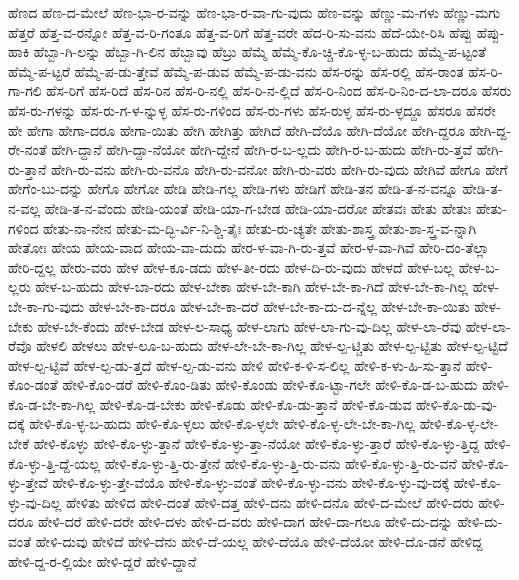 {ಹೆಣದ
ಹೆಣ-ದ-ಮೇಲೆ
ಹೆಣ-ಭಾ-ರ-ವನ್ನು
ಹೆಣ-ಭಾ-ರ-ವಾ-ಗು-ವುದು
ಹೆಣ-ವನ್ನು
ಹೆಣ್ಣು-ಮ-ಗಳು
ಹೆಣ್ಣು-ಮಗು
ಹೆತ್ತರೆ
ಹೆತ್ತ-ವ-ರನ್ನೋ
ಹೆತ್ತ-ವ-ರಿ-ಗಂತೂ
ಹೆತ್ತ-ವ-ರಿಗೆ
ಹೆತ್ತ-ವರೇ
ಹೆದ-ರಿ-ಸು-ವನು
ಹೆದೆ-ಯೇ-ರಿಸಿ
ಹೆಪ್ಪು
ಹೆಪ್ಪು-ಹಾಕಿ
ಹೆಬ್ಬಾ-ಗಿ-ಲನ್ನು
ಹೆಬ್ಬಾ-ಗಿ-ಲಿನ
ಹೆಬ್ಬಾವು
ಹೆಬ್ರು
ಹೆಮ್ಮೆ
ಹೆಮ್ಮೆ-ಕೊ-ಚ್ಚಿ-ಕೊ-ಳ್ಳ-ಬ-ಹುದು
ಹೆಮ್ಮೆ-ಪ-ಟ್ಟಂತೆ
ಹೆಮ್ಮೆ-ಪ-ಟ್ಟರೆ
ಹೆಮ್ಮೆ-ಪ-ಡು-ತ್ತೇವೆ
ಹೆಮ್ಮೆ-ಪ-ಡುವ
ಹೆಮ್ಮೆ-ಪ-ಡು-ವನು
ಹೆಸ-ರನ್ನು
ಹೆಸ-ರಲ್ಲಿ
ಹೆಸ-ರಾಂತ
ಹೆಸ-ರಿ-ಗಾ-ಗಲಿ
ಹೆಸ-ರಿಗೆ
ಹೆಸ-ರಿದೆ
ಹೆಸ-ರಿನ
ಹೆಸ-ರಿ-ನಲ್ಲಿ
ಹೆಸ-ರಿ-ನ-ಲ್ಲಿದೆ
ಹೆಸ-ರಿ-ನಿಂದ
ಹೆಸ-ರಿ-ನಿಂ-ದ-ಲಾ-ದರೂ
ಹೆಸರು
ಹೆಸ-ರು-ಗಳನ್ನು
ಹೆಸ-ರು-ಗ-ಳ-ನ್ನುಳ್ಳ
ಹೆಸ-ರು-ಗಳಿಂದ
ಹೆಸ-ರು-ಗಳು
ಹೆಸ-ರುಳ್ಳ
ಹೆಸ-ರು-ಳ್ಳದ್ದೂ
ಹೆಸರೂ
ಹೆಸರೇ
ಹೇ
ಹೇಗಾ
ಹೇಗಾ-ದರೂ
ಹೇಗಾ-ಯಿತು
ಹೇಗಿ
ಹೇಗಿತ್ತು
ಹೇಗಿದೆ
ಹೇಗಿ-ದೆಯೊ
ಹೇಗಿ-ದೆಯೋ
ಹೇಗಿ-ದ್ದರೂ
ಹೇಗಿ-ದ್ದ-ರೇ-ನಂತೆ
ಹೇಗಿ-ದ್ದಾನೆ
ಹೇಗಿ-ದ್ದಾ-ನೆಯೋ
ಹೇಗಿ-ದ್ದೇನೆ
ಹೇಗಿ-ರ-ಬ-ಲ್ಲದು
ಹೇಗಿ-ರ-ಬ-ಹುದು
ಹೇಗಿ-ರು-ತ್ತವೆ
ಹೇಗಿ-ರು-ತ್ತಾನೆ
ಹೇಗಿ-ರು-ವನು
ಹೇಗಿ-ರು-ವನೊ
ಹೇಗಿ-ರು-ವನೋ
ಹೇಗಿ-ರು-ವರು
ಹೇಗಿ-ರು-ವುದು
ಹೇಗಿವೆ
ಹೇಗೂ
ಹೇಗೆ
ಹೇಗೆಂ-ಬು-ದನ್ನು
ಹೇಗೊ
ಹೇಗೋ
ಹೇಡಿ
ಹೇಡಿ-ಗಲ್ಲ
ಹೇಡಿ-ಗಳು
ಹೇಡಿಗೆ
ಹೇಡಿ-ತನ
ಹೇಡಿ-ತ-ನ-ವನ್ನೂ
ಹೇಡಿ-ತ-ನ-ವಲ್ಲ
ಹೇಡಿ-ತ-ನ-ವೆಂದು
ಹೇಡಿ-ಯಂತೆ
ಹೇಡಿ-ಯಾ-ಗ-ಬೇಡ
ಹೇಡಿ-ಯಾ-ದರೋ
ಹೇತವಃ
ಹೇತು
ಹೇತುಃ
ಹೇತು-ಗಳಿಂದ
ಹೇತು-ನಾ-ನೇನ
ಹೇತು-ಮ-ದ್ಭಿ-ರ್ವಿ-ನಿ-ಶ್ಚಿ-ತೈಃ
ಹೇತು-ರು-ಚ್ಯತೇ
ಹೇತು-ಶಾಸ್ತ್ರ
ಹೇತು-ಶಾ-ಸ್ತ್ರ-ವ-ನ್ನಾಗಿ
ಹೇತೋಃ
ಹೇಯ
ಹೇಯ-ವಾದ
ಹೇಯ-ವಾ-ದುದು
ಹೇರ-ಳ-ವಾ-ಗಿ-ರು-ತ್ತವೆ
ಹೇರ-ಳ-ವಾ-ಗಿವೆ
ಹೇರಿ-ದಂ-ತೆಲ್ಲಾ
ಹೇರಿ-ದ್ದಲ್ಲ
ಹೇರು-ವರು
ಹೇಳ
ಹೇಳ-ಕೂ-ಡದು
ಹೇಳ-ತೀ-ರದು
ಹೇಳ-ದಿ-ರು-ವುದು
ಹೇಳದೆ
ಹೇಳ-ಬಲ್ಲ
ಹೇಳ-ಬ-ಲ್ಲರು
ಹೇಳ-ಬ-ಹುದು
ಹೇಳ-ಬಾ-ರದು
ಹೇಳ-ಬೇಕಾ
ಹೇಳ-ಬೇ-ಕಾಗಿ
ಹೇಳ-ಬೇ-ಕಾ-ಗಿದೆ
ಹೇಳ-ಬೇ-ಕಾ-ಗಿಲ್ಲ
ಹೇಳ-ಬೇ-ಕಾ-ಗು-ವುದು
ಹೇಳ-ಬೇ-ಕಾ-ದರೂ
ಹೇಳ-ಬೇ-ಕಾ-ದರೆ
ಹೇಳ-ಬೇ-ಕಾ-ದು-ದ-ನ್ನೆಲ್ಲ
ಹೇಳ-ಬೇ-ಕಾ-ಯಿತು
ಹೇಳ-ಬೇಕು
ಹೇಳ-ಬೇ-ಕೆಂದು
ಹೇಳ-ಬೇಡ
ಹೇಳ-ಲ-ಸಾಧ್ಯ
ಹೇಳ-ಲಾಗು
ಹೇಳ-ಲಾ-ಗು-ವು-ದಿಲ್ಲ
ಹೇಳ-ಲಾ-ರೆವು
ಹೇಳ-ಲಾ-ರೆವೊ
ಹೇಳಲಿ
ಹೇಳಲು
ಹೇಳ-ಲೂ-ಬ-ಹುದು
ಹೇಳ-ಲೇ-ಬೇ-ಕಾ-ಗಿಲ್ಲ
ಹೇಳ-ಲ್ಪ-ಟ್ಚಿತು
ಹೇಳ-ಲ್ಪ-ಟ್ಟಿತು
ಹೇಳ-ಲ್ಪ-ಟ್ಟಿದೆ
ಹೇಳ-ಲ್ಪ-ಟ್ಟಿವೆ
ಹೇಳ-ಲ್ಪ-ಡು-ತ್ತದೆ
ಹೇಳ-ಲ್ಪ-ಡು-ವನು
ಹೇಳಿ
ಹೇಳಿ-ಕ-ಳಿ-ಸ-ಲಿಲ್ಲ
ಹೇಳಿ-ಕ-ಳು-ಹಿ-ಸು-ತ್ತಾನೆ
ಹೇಳಿ-ಕೊಂ-ಡಂತೆ
ಹೇಳಿ-ಕೊಂ-ಡರೆ
ಹೇಳಿ-ಕೊಂ-ಡಿತು
ಹೇಳಿ-ಕೊಂಡು
ಹೇಳಿ-ಕೊ-ಟ್ಟಾ-ಗಲೇ
ಹೇಳಿ-ಕೊ-ಡ-ಬ-ಹುದು
ಹೇಳಿ-ಕೊ-ಡ-ಬೇ-ಕಾ-ಗಿಲ್ಲ
ಹೇಳಿ-ಕೊ-ಡ-ಬೇಕು
ಹೇಳಿ-ಕೊಡು
ಹೇಳಿ-ಕೊ-ಡು-ತ್ತಾನೆ
ಹೇಳಿ-ಕೊ-ಡುವ
ಹೇಳಿ-ಕೊ-ಡು-ವು-ದಕ್ಕೆ
ಹೇಳಿ-ಕೊ-ಳ್ಳ-ಬ-ಹುದು
ಹೇಳಿ-ಕೊ-ಳ್ಳಲು
ಹೇಳಿ-ಕೊ-ಳ್ಳಲೇ
ಹೇಳಿ-ಕೊ-ಳ್ಳ-ಲೇ-ಬೇ-ಕಾ-ಗಿಲ್ಲ
ಹೇಳಿ-ಕೊ-ಳ್ಳ-ಲೇ-ಬೇಕೆ
ಹೇಳಿ-ಕೊಳ್ಳು
ಹೇಳಿ-ಕೊ-ಳ್ಳು-ತ್ತಾನೆ
ಹೇಳಿ-ಕೊ-ಳ್ಳು-ತ್ತಾ-ನೆಯೋ
ಹೇಳಿ-ಕೊ-ಳ್ಳು-ತ್ತಾರೆ
ಹೇಳಿ-ಕೊ-ಳ್ಳು-ತ್ತಿದ್ದ
ಹೇಳಿ-ಕೊ-ಳ್ಳು-ತ್ತಿ-ದ್ದೆ-ಯಲ್ಲ
ಹೇಳಿ-ಕೊ-ಳ್ಳು-ತ್ತಿ-ರು-ತ್ತೇನೆ
ಹೇಳಿ-ಕೊ-ಳ್ಳು-ತ್ತಿ-ರು-ವನು
ಹೇಳಿ-ಕೊ-ಳ್ಳು-ತ್ತಿ-ರು-ವನೆ
ಹೇಳಿ-ಕೊ-ಳ್ಳು-ತ್ತೇವೆ
ಹೇಳಿ-ಕೊ-ಳ್ಳು-ತ್ತೇ-ವೆಯೊ
ಹೇಳಿ-ಕೊ-ಳ್ಳು-ವಂತೆ
ಹೇಳಿ-ಕೊ-ಳ್ಳು-ವನು
ಹೇಳಿ-ಕೊ-ಳ್ಳು-ವು-ದಕ್ಕೆ
ಹೇಳಿ-ಕೊ-ಳ್ಳು-ವು-ದಿಲ್ಲ
ಹೇಳಿತು
ಹೇಳಿದ
ಹೇಳಿ-ದಂತೆ
ಹೇಳಿ-ದತ್ತ
ಹೇಳಿ-ದನು
ಹೇಳಿ-ದನೊ
ಹೇಳಿ-ದ-ಮೇಲೆ
ಹೇಳಿ-ದರು
ಹೇಳಿ-ದರೂ
ಹೇಳಿ-ದರೆ
ಹೇಳಿ-ದರೇ
ಹೇಳಿ-ದಳು
ಹೇಳಿ-ದ-ವರು
ಹೇಳಿ-ದಾಗ
ಹೇಳಿ-ದಾ-ಗಲೂ
ಹೇಳಿ-ದು-ದನ್ನು
ಹೇಳಿ-ದು-ವಂತೆ
ಹೇಳಿ-ದುವು
ಹೇಳಿದೆ
ಹೇಳಿ-ದೆನು
ಹೇಳಿ-ದೆ-ಯಲ್ಲ
ಹೇಳಿ-ದೆಯೊ
ಹೇಳಿ-ದೆಯೋ
ಹೇಳಿ-ದೊ-ಡನೆ
ಹೇಳಿದ್ದ
ಹೇಳಿ-ದ್ದ-ರ-ಲ್ಲಿಯೇ
ಹೇಳಿ-ದ್ದರೆ
ಹೇಳಿ-ದ್ದಾನೆ
}

